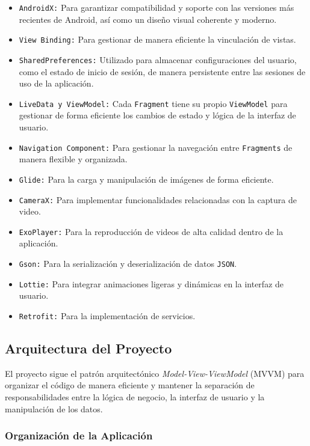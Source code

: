 \begin{itemize}
    \item \texttt{AndroidX:} Para garantizar compatibilidad y soporte con las versiones más recientes de Android, así como un diseño visual coherente y moderno.
    \item \texttt{View Binding:} Para gestionar de manera eficiente la vinculación de vistas.
    \item \texttt{SharedPreferences:} Utilizado para almacenar configuraciones del usuario, como el estado de inicio de sesión, de manera persistente entre las sesiones de uso de la aplicación.
    \item \texttt{LiveData y ViewModel:} Cada  \texttt{Fragment} tiene su propio  \texttt{ViewModel} para gestionar de forma eficiente los cambios de estado y lógica de la interfaz de usuario.
    \item \texttt{Navigation Component:} Para gestionar la navegación entre  \texttt{Fragments} de manera flexible y organizada.
    \item \texttt{Glide:} Para la carga y manipulación de imágenes de forma eficiente.
    \item \texttt{CameraX:} Para implementar funcionalidades relacionadas con la captura de video.
    \item \texttt{ExoPlayer:} Para la reproducción de videos de alta calidad dentro de la aplicación.
    \item \texttt{Gson:} Para la serialización y deserialización de datos \texttt{JSON}.
    \item \texttt{Lottie:} Para integrar animaciones ligeras y dinámicas en la interfaz de usuario.
    \item \texttt{Retrofit:} Para la implementación de servicios. 
\end{itemize}


\subsection{Arquitectura del Proyecto}

El proyecto sigue el patrón arquitectónico \textit{Model-View-ViewModel} (MVVM) para organizar el código de manera eficiente y mantener la separación de responsabilidades entre la lógica de negocio, la interfaz de usuario y la manipulación de los datos.

\subsubsection{Organización de la Aplicación}

